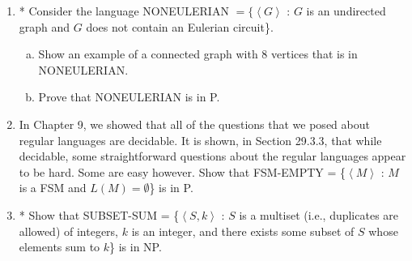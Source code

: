 \documentclass[10pt]{article}
\newcommand{\brackets}[1]{\left< #1 \right>}
\begin{document}
\begin{enumerate}[1)]

\item
* Consider the language NONEULERIAN $= \{\brackets{G}$ : $G$ is an undirected graph and $G$ does not contain an Eulerian
circuit\}.
\begin{enumerate}[a)]
\item
Show an example of a connected graph with 8 vertices that is in NONEULERIAN.
\item
Prove that NONEULERIAN is in P.
\end{enumerate}


\item
In Chapter 9, we showed that all of the questions that we posed about regular languages are decidable.  It is shown,
in Section 29.3.3, that while decidable, some straightforward questions about the regular languages appear to be
hard.  Some are easy however.  Show that FSM-EMPTY = \{$\brackets{M}$ : $M$ is a FSM and $L(M) = \emptyset$\} is in P.


\item
* Show that SUBSET-SUM = \{$\brackets{S, k}$ : $S$ is a multiset (i.e., duplicates are allowed) of integers, $k$ is an integer, and
there exists some subset of $S$ whose elements sum to $k$\} is in NP.



\end{enumerate}
\end{document}
